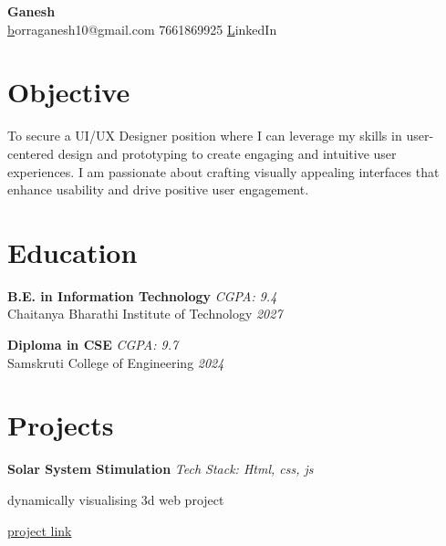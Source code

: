 \documentclass[a4paper,10pt]{article}
\begin{document}
\begin{center}
    {\huge \textbf{ Ganesh }} \\
    \vspace{5pt}
    \small \href{mailto:borraganesh10@gmail.com } borraganesh10@gmail.com \quad \textbullet{} 7661869925     
    \quad \textbullet{} \href{ https://www.linkedin.com/in/ganesh10-/ }LinkedIn 
  
\end{center}

    
\section*{Objective}
\noindent
To secure a UI/UX Designer position where I can leverage my skills in user-centered design and prototyping to create engaging and intuitive user experiences. I am passionate about crafting visually appealing interfaces that enhance usability and drive positive user engagement.
\vspace{0.3cm}


\section*{Education}

\noindent
\textbf{ B.E. in Information Technology } \hfill  \textit{ CGPA: 9.4 } \\
Chaitanya Bharathi Institute of Technology  \hfill  \textit{ 2027 } 
\vspace{0.3cm}

\noindent
\textbf{ Diploma in CSE } \hfill  \textit{ CGPA: 9.7 } \\
Samskruti College of Engineering  \hfill  \textit{ 2024 } 
\vspace{0.3cm}



\section*{Projects}
\noindent
\begin{compactitem}
    
        \item\textbf{ Solar System Stimulation } \hfill \textit{ Tech Stack: Html, css, js } 
        \begin{compactitem}
            
            \item dynamically visualising 3d web project
            
        \end{compactitem}
        \href{ www.google.com }{project link}
    
\end{compactitem}
\end{document}
